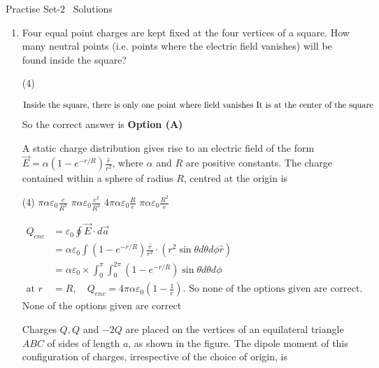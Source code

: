 \newpage
\begin{abox}
	Practise Set-2 \ Solutions
\end{abox}
\begin{enumerate}[label=\color{ocre}\textbf{\arabic*.}]
\item Four equal point charges are kept fixed at the four vertices of a square. How many neutral points (i.e. points where the electric field vanishes) will be found inside the square?
{}
\begin{tasks}(4)
\end{tasks}
\begin{answer}
	\begin{align*}
	\intertext{Inside the square, there is only one point where field vanishes It is at the center of the square}
	\end{align*}
	So the correct answer is \textbf{Option (A)}
\end{answer}
\question A static charge distribution gives rise to an electric field of the form $\vec{E}=\alpha\left(1-e^{-r / R}\right) \frac{\hat{r}}{r^{2}}$, where $\alpha$ and $R$ are positive constants. The charge contained within a sphere of radius $R$, centred at the origin is
{}
\begin{tasks}(4)
	\task[\textbf{A.}] $\pi \alpha \varepsilon_{0} \frac{e}{R^{2}}$
	\task[\textbf{B.}]  $\pi \alpha \varepsilon_{0} \frac{e^{2}}{R^{2}}$
	\task[\textbf{C.}] $4 \pi \alpha \varepsilon_{0} \frac{R}{e}$
	\task[\textbf{D.}] $\pi \alpha \varepsilon_{0} \frac{R^{2}}{e}$
\end{tasks}
\begin{answer}
	\begin{align*}
	Q_{e n c}&=\varepsilon_{0} \oint \vec{E} \cdot d \vec{a}\\&=\alpha \varepsilon_{0} \int\left(1-e^{-r / R}\right) \frac{\hat{r}}{r^{2}} \cdot\left(r^{2} \sin \theta d \theta d \phi \hat{r}\right)\\&=\alpha \varepsilon_{0} \times \int_{0}^{\pi} \int_{0}^{2 \pi}\left(1-e^{-r / R}\right) \sin \theta d \theta d \phi\\
	\text{at }r&=R, \quad Q_{e n c}=4 \pi \alpha \varepsilon_{0}\left(1-\frac{1}{e}\right).\text{ So none of the options given are correct.}
	\end{align*}
	None of the options given are correct
\end{answer}
	\question Charges $Q, Q$ and $-2 Q$ are placed on the vertices of an equilateral triangle $A B C$ of sides of length $a$, as shown in the figure. The dipole moment of this configuration of charges, irrespective of the choice of origin, is
{}


\end{enumerate}

